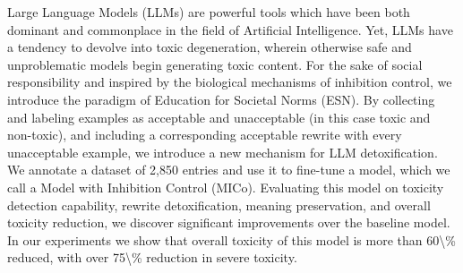 Large Language Models (LLMs) are powerful tools which have been both dominant and commonplace in the field of Artificial Intelligence. Yet, LLMs have a tendency to devolve into toxic degeneration, wherein otherwise safe and unproblematic models begin generating toxic content. For the sake of social responsibility and inspired by the biological mechanisms of inhibition control, we introduce the paradigm of Education for Societal Norms (ESN). By collecting and labeling examples as acceptable and unacceptable (in this case toxic and non-toxic), and including a corresponding acceptable rewrite with every unacceptable example, we introduce a new mechanism for LLM detoxification.  We annotate a dataset of 2,850 entries and use it to fine-tune a model, which we call a Model with Inhibition Control (MICo). Evaluating this model on toxicity detection capability, rewrite detoxification, meaning preservation, and overall toxicity reduction, we discover significant improvements over the baseline model. In our experiments we show that overall toxicity of this model is more than 60\textbackslash{}\% reduced, with over 75\textbackslash{}\% reduction in severe toxicity.